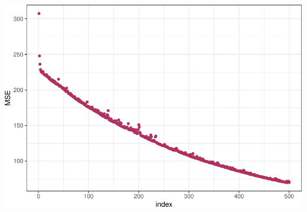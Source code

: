 \documentclass[]{article}
\begin{document}
\includegraphics{lab3_files/figure-latex/unnamed-chunk-7-1.pdf}
\end{document}
